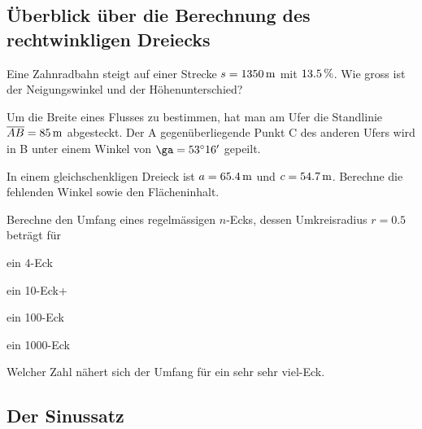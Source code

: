 \documentclass[%
11pt,%
twoside,%
titlepage,%
german,%
headsepline%
]{scrartcl}
\begin{document}
\subsection{Überblick über die Berechnung des rechtwinkligen
Dreiecks}
\begin{ueb}[Zahnradbahn]
  Eine Zahnradbahn steigt auf einer Strecke $s=\unit[1350]{m}$ mit
  $\unit[13.5]{\%}$. Wie gross ist der Neigungswinkel und der
  Höhenunterschied?
\end{ueb}
\begin{ueb}[Fluss]
  Um die Breite eines Flusses zu bestimmen, hat man am Ufer die
  Standlinie $\overline{AB}=\unit[85]{m}$ abgesteckt. Der A
  gegenüberliegende Punkt C des anderen Ufers wird in B unter einem
  Winkel von $\ga = 53^\circ16'$ gepeilt.
\end{ueb}
\begin{ueb}[gleichschenklig]
  In einem gleichschenkligen Dreieck ist $a=\unit[65.4]{m}$ und
  $c=\unit[54.7]{m}$. Berechne die fehlenden Winkel
  sowie den Flächeninhalt.
\end{ueb}
\begin{ueb}[$n$-Eck]
  Berechne den Umfang eines regelmässigen $n$-Ecks, dessen
  Umkreisradius $r=0.5$ beträgt für
  
  \begin{minipage}{0.49\textwidth}
  \begin{enumeratea}
    \item ein 4-Eck
    \item ein 10-Eck+
    \end{enumeratea}
    \end{minipage}
    \begin{minipage}{0.49\textwidth}
    \begin{enumeratea}
    \addtocounter{enumi}{2}
    \item ein 100-Eck
    \item ein 1000-Eck\\
    \end{enumeratea}
    \end{minipage}
    
\noindent Welcher Zahl nähert sich der Umfang für ein \glqq sehr sehr viel-Eck\grqq.
\end{ueb}

\subsection{Der Sinussatz}
\end{document}
